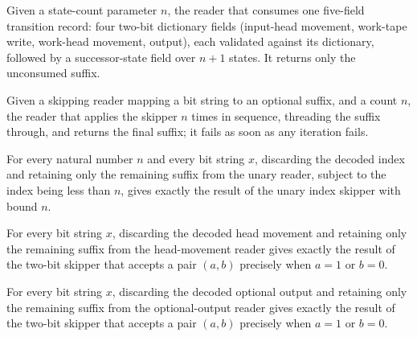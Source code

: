 \begin{definition}
\label{Turing.codeSkipAction}
\leanok
{}
Given a state-count parameter $n$, the reader that consumes one five-field
transition record: four two-bit dictionary fields (input-head movement,
work-tape write, work-head movement, output), each validated against its
dictionary, followed by a successor-state field over $n + 1$ states.  It
returns only the unconsumed suffix.
\end{definition}

\begin{definition}
\label{Turing.codeSkipRepeat}
\leanok
Given a skipping reader mapping a bit string to an optional suffix, and a count
$n$, the reader that applies the skipper $n$ times in sequence, threading the
suffix through, and returns the final suffix; it fails as soon as any
iteration fails.
\end{definition}

\begin{lemma}
\label{Turing.codeEraseFin}
\leanok
{}
For every natural number $n$ and every bit string $x$, discarding the decoded index and
retaining only the remaining suffix from the unary reader, subject to the index being
less than $n$, gives exactly the result of the unary index skipper with bound $n$.
\end{lemma}

\begin{lemma}
\label{Turing.codeEraseSign}
\leanok
{}
For every bit string $x$, discarding the decoded head movement and retaining only the
remaining suffix from the head-movement reader gives exactly the result of the two-bit
skipper that accepts a pair $(a,b)$ precisely when $a=1$ or $b=0$.
\end{lemma}

\begin{lemma}
\label{Turing.codeEraseOutput}
\leanok
{}
For every bit string $x$, discarding the decoded optional output and retaining only the
remaining suffix from the optional-output reader gives exactly the result of the two-bit
skipper that accepts a pair $(a,b)$ precisely when $a=1$ or $b=0$.
\end{lemma}

